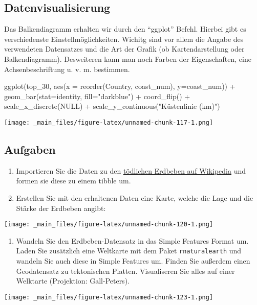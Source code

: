 \documentclass[11pt,german,a4paper]{article}
\newenvironment{Shaded}{\begin{snugshade}}{\end{snugshade}}
\newcommand{\AttributeTok}[1]{\textcolor[rgb]{0.77,0.63,0.00}{#1}}
\newcommand{\ConstantTok}[1]{\textcolor[rgb]{0.00,0.00,0.00}{#1}}
\newcommand{\FunctionTok}[1]{\textcolor[rgb]{0.00,0.00,0.00}{#1}}
\newcommand{\NormalTok}[1]{#1}
\newcommand{\SpecialCharTok}[1]{\textcolor[rgb]{0.00,0.00,0.00}{#1}}
\newcommand{\StringTok}[1]{\textcolor[rgb]{0.31,0.60,0.02}{#1}}
\providecommand{\tightlist}{%
  \setlength{\itemsep}{0pt}\setlength{\parskip}{0pt}}
\begin{document}
\hypertarget{datenvisualisierung}{%
\subsection{Datenvisualisierung}\label{datenvisualisierung}}

Das Balkendiagramm erhalten wir durch den ``ggplot'' Befehl. Hierbei gibt es verschiedenste Einstellmöglichkeiten. Wichitg sind vor allem die Angabe des verwendeten Datensatzes und die Art der Grafik (ob Kartendarstellung oder Balkendiagramm). Desweiteren kann man noch Farben der Eigenschaften, eine Achsenbeschriftung u. v. m. bestimmen.

\begin{Shaded}
\begin{Highlighting}[]
\FunctionTok{ggplot}\NormalTok{(top\_30, }\FunctionTok{aes}\NormalTok{(}\AttributeTok{x =} \FunctionTok{reorder}\NormalTok{(Country, coast\_num), }\AttributeTok{y=}\NormalTok{coast\_num)) }\SpecialCharTok{+}
  \FunctionTok{geom\_bar}\NormalTok{(}\AttributeTok{stat=}\StringTok{\textquotesingle{}identity\textquotesingle{}}\NormalTok{, }\AttributeTok{fill=}\StringTok{"darkblue"}\NormalTok{) }\SpecialCharTok{+}
  \FunctionTok{coord\_flip}\NormalTok{() }\SpecialCharTok{+}
  \FunctionTok{scale\_x\_discrete}\NormalTok{(}\ConstantTok{NULL}\NormalTok{) }\SpecialCharTok{+}
  \FunctionTok{scale\_y\_continuous}\NormalTok{(}\StringTok{"Küstenlinie (km)"}\NormalTok{)}
\end{Highlighting}
\end{Shaded}

\texttt{[image: \_main\_files/figure-latex/unnamed-chunk-117-1.png]}

\hypertarget{aufgaben-5}{%
\subsection{Aufgaben}\label{aufgaben-5}}

\begin{enumerate}
\def\labelenumi{\arabic{enumi}.}
\item
  Importieren Sie die Daten zu den \href{https://en.wikipedia.org/wiki/List_of_deadly_earthquakes_since_1900}{tödlichen Erdbeben auf Wikipedia}
  und formen sie diese zu einem tibble um.
\item
  Erstellen Sie mit den erhaltenen Daten eine Karte, welche die Lage und die Stärke der Erdbeben angibt:
\end{enumerate}

\texttt{[image: \_main\_files/figure-latex/unnamed-chunk-120-1.png]}

\begin{enumerate}
\def\labelenumi{\arabic{enumi}.}
\setcounter{enumi}{2}
\tightlist
\item
  Wandeln Sie den Erdbeben-Datensatz in das Simple Features Format um. Laden Sie zusätzlich eine Weltkarte mit dem Paket \texttt{rnaturalearth} und wandeln Sie auch diese in Simple Features um. Finden Sie außerdem einen Geodatensatz zu tektonischen Platten. Visualiseren Sie alles auf einer Welktarte (Projektion: Gall-Peters).
\end{enumerate}

\texttt{[image: \_main\_files/figure-latex/unnamed-chunk-123-1.png]}
\end{document}

